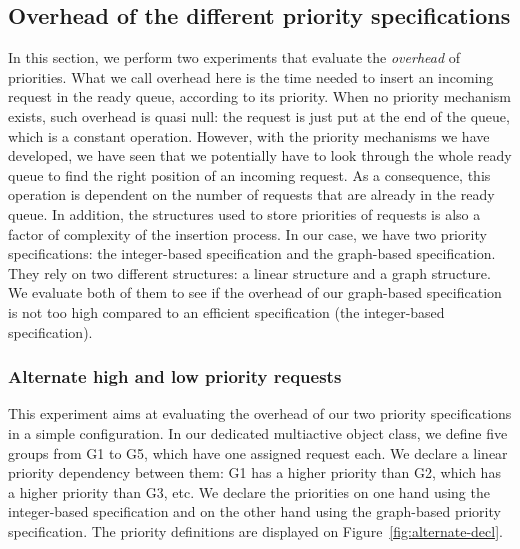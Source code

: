\documentclass[11pt]{report}
\begin{document}
\subsection{Overhead of the different priority specifications}
In this section, we perform two experiments that evaluate the \emph{overhead} of priorities. What we call overhead here is the time needed to insert an incoming request in the ready queue, according to its priority. When no priority mechanism exists, such overhead is quasi null: the request is just put at the end of the queue, which is a constant operation. However, with the priority mechanisms we have developed, we have seen that we potentially have to look through the whole ready queue to find the right position of an incoming request. As a consequence, this operation is dependent on the number of requests that are already in the ready queue. In addition, the structures used to store priorities of requests is also a factor of complexity of the insertion process. In our case, we have two priority specifications: the integer-based specification and the graph-based specification. They rely on two different structures: a linear structure and a graph structure. We evaluate both of them to see if the overhead of our graph-based specification is not too high compared to an efficient specification (the integer-based specification). 

\subsubsection{Alternate high and low priority requests}
This experiment aims at evaluating the overhead of our two priority specifications in a simple configuration. In our dedicated multiactive object class, we define five groups from G1 to G5, which have one assigned request each. We declare a linear priority dependency between them: G1 has a higher priority than G2, which has a higher priority than G3, etc. We declare the priorities on one hand using the integer-based specification and on the other hand using the graph-based priority specification. The priority definitions are displayed on Figure~\ref{fig:alternate-decl}.
\end{document}
